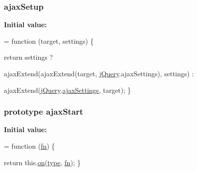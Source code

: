 \subsubsection[{\texorpdfstring{ajax\+Setup}{ajaxSetup}}]{ ajax\+Setup}\hypertarget{jquery-2_82_81-vsdoc_8js_a3b12f4f2a83dfdae4e81bcaeaf2a2f42}{}\label{jquery-2_82_81-vsdoc_8js_a3b12f4f2a83dfdae4e81bcaeaf2a2f42}
{\bfseries Initial value\+:}
\begin{DoxyCode}
= \textcolor{keyword}{function} (target, settings) \{
        

        \textcolor{keywordflow}{return} settings ?

            
            ajaxExtend(ajaxExtend(target, \hyperlink{jquery-2_82_81-vsdoc_8js_add5237586d970a38a81f990e8eb28c6c}{jQuery}.ajaxSettings), settings) :

            
            ajaxExtend(\hyperlink{jquery-2_82_81-vsdoc_8js_add5237586d970a38a81f990e8eb28c6c}{jQuery}.\hyperlink{jquery-2_82_81-vsdoc_8js_adcbb4ce9148aaf3a9a165b2ac462163b}{ajaxSettings}, target);
    \}
\end{DoxyCode}
\subsubsection[{\texorpdfstring{ajax\+Start}{ajaxStart}}]{ {\bf prototype} ajax\+Start}\hypertarget{jquery-2_82_81-vsdoc_8js_af53db176b2b7bf3cd611342f2e94309a}{}\label{jquery-2_82_81-vsdoc_8js_af53db176b2b7bf3cd611342f2e94309a}
{\bfseries Initial value\+:}
\begin{DoxyCode}
= \textcolor{keyword}{function} (\hyperlink{jquery-2_82_81-vsdoc_8js_acef6bdaf6b9b20fdcca1ea86f0902c3b}{fn}) \{
        

        \textcolor{keywordflow}{return} this.\hyperlink{jquery-2_82_81-vsdoc_8js_ae453b412b883f60220d73468ef6c6dbc}{on}(\hyperlink{jquery-2_82_81-vsdoc_8js_a3940565e83a9bfd10d95ffd27536da91}{type}, \hyperlink{jquery-2_82_81-vsdoc_8js_acef6bdaf6b9b20fdcca1ea86f0902c3b}{fn});
    \}
\end{DoxyCode}
